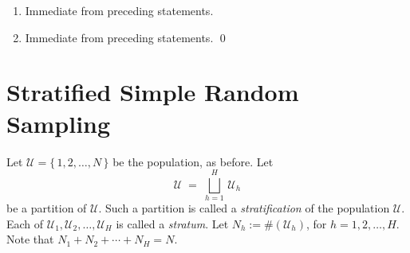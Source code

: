 \documentclass{article}
\begin{document}
\begin{enumerate}
\begin{eqnarray*}
                          -n\left(\widehat{\overline{y}}_{\textnormal{SRS}}-\overline{y}\right)^{2} \;\right] \\
              & = &  \dfrac{1}{n-1}\left\{\;E\!\left[\; \sum_{i=1}^{N}Z_{i}(y_{i}-\overline{y})^{2} \;\right]
                          - n\,\textnormal{Var}\!\left[\;\widehat{\overline{y}}_{\textnormal{SRS}}\;\right] \right\} \\
              & = &  \dfrac{1}{n-1}\left\{\; \sum_{i=1}^{N} E\!\left[\; Z_{i} \;\right] (y_{i}-\overline{y})^{2}
                          - n\left(1-\dfrac{n}{N}\right)\dfrac{S^{2}}{n} \; \right\} \\
              & = &  \dfrac{1}{n-1}\left\{\;\sum_{i=1}^{N} \dfrac{n}{N} (y_{i}-\overline{y})^{2}
                          - \left(1-\dfrac{n}{N}\right)S^{2}\;\right\} \\
              & = &  \dfrac{1}{n-1}\left\{\;\dfrac{n(N-1)}{N}\dfrac{1}{N-1}\sum_{i=1}^{N} (y_{i}-\overline{y})^{2}
                          - \left(1-\dfrac{n}{N}\right)S^{2}\;\right\} \\
              & = &  \dfrac{1}{n-1}\left\{\;\dfrac{n(N-1)}{N} - \left(1-\dfrac{n}{N}\right)\;\right\} S^{2} \\
              & = &  \dfrac{1}{n-1}\left\{\;\dfrac{nN-n-N+n}{N}\;\right\} S^{2} \;\; = \;\; S^{2}
          \end{eqnarray*}
\item  Immediate from preceding statements.
\item  Immediate from preceding statements. \qed
\end{enumerate}


\section{Stratified Simple Random Sampling}
\setcounter{theorem}{0}

Let $\mathcal{U} = \{\,1,2,\ldots,N\,\}$ be the population, as before.  Let
\begin{equation*}
    \mathcal{U} \; = \; \bigsqcup_{h=1}^{H}\,\mathcal{U}_{h}
\end{equation*}
be a partition of $\mathcal{U}$.  Such a partition is called a \emph{stratification} of the population $\mathcal{U}$.
Each of $\mathcal{U}_{1}, \mathcal{U}_{2}, \ldots, \mathcal{U}_{H}$ is called a \emph{stratum}.
Let $N_{h} := \#\!\left(\mathcal{U}_{h}\right)$, for $h=1,2,\ldots,H$.  Note that $N_{1}+N_{2}+\cdots+N_{H} = N$.
\end{document}
